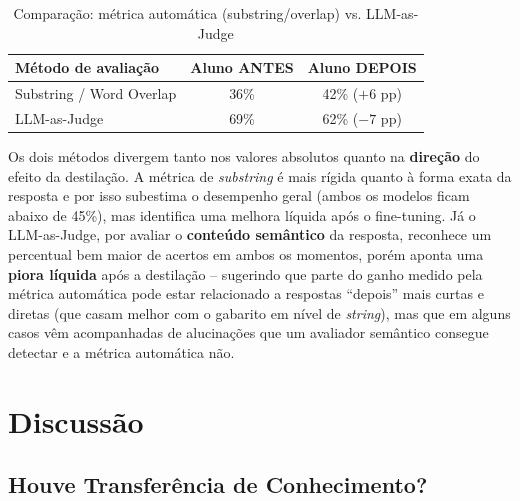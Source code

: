 \documentclass[12pt, a4paper]{article}
\begin{document}
\begin{table}[H]
\centering
\caption{Comparação: métrica automática (substring/overlap) vs. LLM-as-Judge}
\begin{tabular}{lcc}
\toprule
\textbf{Método de avaliação} & \textbf{Aluno ANTES} & \textbf{Aluno DEPOIS} \\
\midrule
Substring / Word Overlap & 36\% & 42\% ($+6$ pp) \\
LLM-as-Judge             & 69\% & 62\% ($-7$ pp) \\
\bottomrule
\end{tabular}
\end{table}

Os dois métodos divergem tanto nos valores absolutos quanto na \textbf{direção} do
efeito da destilação. A métrica de \textit{substring} é mais rígida quanto à forma
exata da resposta e por isso subestima o desempenho geral (ambos os modelos ficam
abaixo de 45\%), mas identifica uma melhora líquida após o fine-tuning. Já o
LLM-as-Judge, por avaliar o \textbf{conteúdo semântico} da resposta, reconhece um
percentual bem maior de acertos em ambos os momentos, porém aponta uma
\textbf{piora líquida} após a destilação -- sugerindo que parte do ganho medido pela
métrica automática pode estar relacionado a respostas ``depois'' mais curtas e
diretas (que casam melhor com o gabarito em nível de \textit{string}), mas que em
alguns casos vêm acompanhadas de alucinações que um avaliador semântico consegue
detectar e a métrica automática não.

\section{Discussão}

\subsection{Houve Transferência de Conhecimento?}
\end{document}
